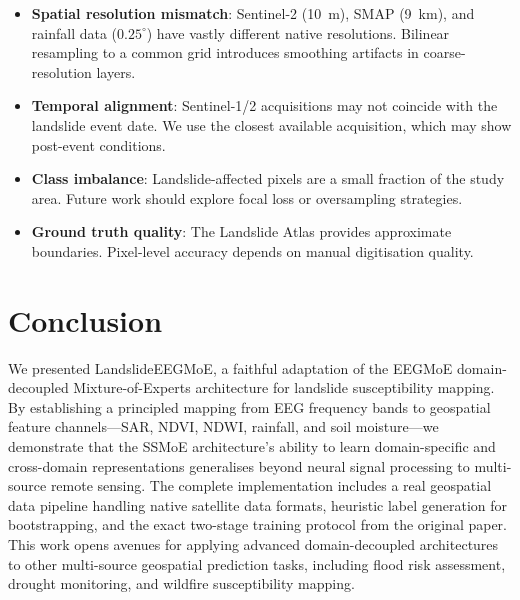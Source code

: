 \documentclass[conference]{IEEEtran}
\begin{document}
\begin{itemize}
    \item \textbf{Spatial resolution mismatch}: Sentinel-2 (10~m), SMAP (9~km), and rainfall data ($0.25^{\circ}$) have vastly different native resolutions. Bilinear resampling to a common grid introduces smoothing artifacts in coarse-resolution layers.
    
    \item \textbf{Temporal alignment}: Sentinel-1/2 acquisitions may not coincide with the landslide event date. We use the closest available acquisition, which may show post-event conditions.
    
    \item \textbf{Class imbalance}: Landslide-affected pixels are a small fraction of the study area. Future work should explore focal loss or oversampling strategies.
    
    \item \textbf{Ground truth quality}: The Landslide Atlas provides approximate boundaries. Pixel-level accuracy depends on manual digitisation quality.
\end{itemize}

\section{Conclusion}

We presented LandslideEEGMoE, a faithful adaptation of the EEGMoE domain-decoupled Mixture-of-Experts architecture for landslide susceptibility mapping. By establishing a principled mapping from EEG frequency bands to geospatial feature channels—SAR, NDVI, NDWI, rainfall, and soil moisture—we demonstrate that the SSMoE architecture's ability to learn domain-specific and cross-domain representations generalises beyond neural signal processing to multi-source remote sensing. The complete implementation includes a real geospatial data pipeline handling native satellite data formats, heuristic label generation for bootstrapping, and the exact two-stage training protocol from the original paper. This work opens avenues for applying advanced domain-decoupled architectures to other multi-source geospatial prediction tasks, including flood risk assessment, drought monitoring, and wildfire susceptibility mapping.
\end{document}
